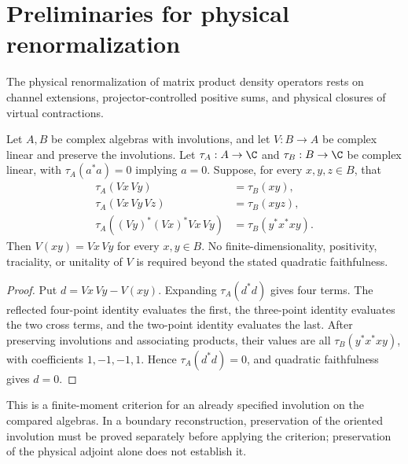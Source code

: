 \section{Preliminaries for physical renormalization}

The physical renormalization of matrix product density operators rests on
channel extensions, projector-controlled positive sums, and physical closures of
virtual contractions.

\begin{lemma}
    \label{thm:reflected_short_contractions_multiplicative}
    \leanok
    Let $A,B$ be complex algebras with involutions, and let
    $V:B\to A$ be complex linear and preserve the involutions.
    Let $\tau_A:A\to\C$ and $\tau_B:B\to\C$ be complex linear,
    with $\tau_A(a^*a)=0$ implying $a=0$.
    Suppose, for every $x,y,z\in B$, that
    \begin{align*}
        \tau_A(Vx\,Vy)             & =\tau_B(xy),       \\
        \tau_A(Vx\,Vy\,Vz)         & =\tau_B(xyz),      \\
        \tau_A((Vy)^*(Vx)^*Vx\,Vy) & =\tau_B(y^*x^*xy).
    \end{align*}
    Then $V(xy)=Vx\,Vy$ for every $x,y\in B$.
    No finite-dimensionality, positivity, traciality, or unitality of
    $V$ is required beyond the stated quadratic faithfulness.
\end{lemma}
\begin{proof}\leanok
    Put $d=Vx\,Vy-V(xy)$. Expanding $\tau_A(d^*d)$ gives four
    terms. The reflected four-point identity evaluates the first,
    the three-point identity evaluates the two cross terms, and
    the two-point identity evaluates the last. After preserving
    involutions and associating products, their values are all
    $\tau_B(y^*x^*xy)$, with coefficients $1,-1,-1,1$.
    Hence $\tau_A(d^*d)=0$, and quadratic faithfulness gives $d=0$.
\end{proof}

This is a finite-moment criterion for an already specified involution
on the compared algebras. In a boundary reconstruction, preservation
of the oriented involution must be proved separately before applying
the criterion; preservation of the physical adjoint alone does not
establish it.




